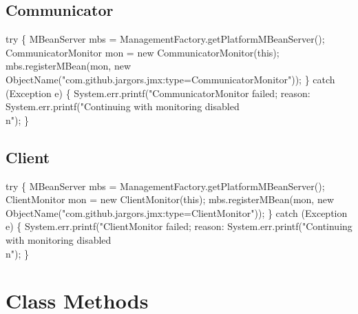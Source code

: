 \subsection{Communicator}
\nwenddocs{}\endmoddef{}
try \{
  MBeanServer mbs = ManagementFactory.getPlatformMBeanServer();
  CommunicatorMonitor mon = new CommunicatorMonitor(this);
  mbs.registerMBean(mon, new ObjectName("com.github.jargors.jmx:type=CommunicatorMonitor"));
\} catch (Exception e) \{
  System.err.printf("CommunicatorMonitor failed; reason: %
  System.err.printf("Continuing with monitoring disabled\\n");
\}
\nwendcode{}\nwdocspar

\subsection{Client}
\nwenddocs{}\endmoddef{}
try \{
  MBeanServer mbs = ManagementFactory.getPlatformMBeanServer();
  ClientMonitor mon = new ClientMonitor(this);
  mbs.registerMBean(mon, new ObjectName("com.github.jargors.jmx:type=ClientMonitor"));
\} catch (Exception e) \{
  System.err.printf("ClientMonitor failed; reason: %
  System.err.printf("Continuing with monitoring disabled\\n");
\}
\nwendcode{}\nwdocspar

\section{Class Methods}
